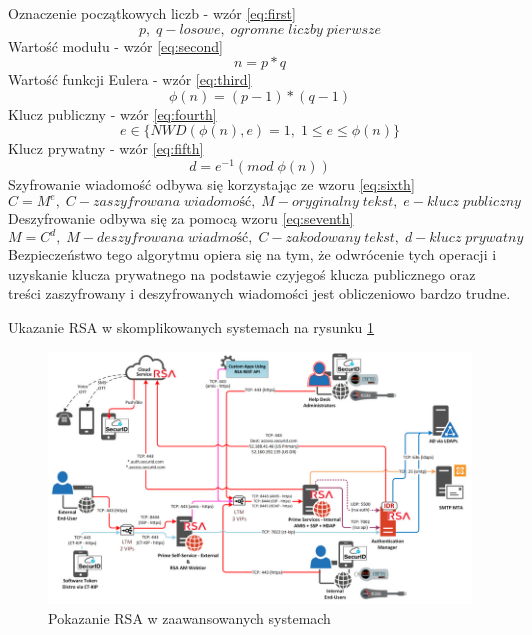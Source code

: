 Oznaczenie początkowych liczb - wzór \ref{eq:first}
\begin{equation}
    p, \; q-losowe, \; ogromne \; liczby \; pierwsze
    \label{eq:first}
\end{equation}
Wartość modułu - wzór \ref{eq:second}
\begin{equation}
    n=p*q
    \label{eq:second}
\end{equation}
Wartość funkcji Eulera - wzór \ref{eq:third}
\begin{equation}
    \phi(n)=(p-1)*(q-1)
    \label{eq:third}
\end{equation}
Klucz publiczny - wzór \ref{eq:fourth}
\begin{equation}
    e \in \{NWD(\phi(n),e)=1, \; 1 \leqslant e \leqslant \phi(n)\}
    \label{eq:fourth}
\end{equation}
Klucz prywatny - wzór \ref{eq:fifth}
\begin{equation}
    d= e^{-1} (mod \; \phi(n))
    \label{eq:fifth}
\end{equation}
Szyfrowanie wiadomość odbywa się korzystając ze wzoru \ref{eq:sixth}
\begin{equation}
    C= M^e, \; C-zaszyfrowana \;  wiadomość, \; M-oryginalny \; tekst, \; e-klucz \; publiczny
    \label{eq:sixth}
\end{equation}
Deszyfrowanie odbywa się za pomocą wzoru \ref{eq:seventh}
\begin{equation}
    M= C^d, \; M-deszyfrowana \; wiadmość, \;C-zakodowany \; tekst, \; d-klucz \; prywatny
    \label{eq:seventh}
\end{equation}
Bezpieczeństwo tego algorytmu opiera się na tym, że odwrócenie tych operacji i uzyskanie klucza prywatnego na podstawie czyjegoś klucza publicznego oraz treści zaszyfrowany i deszyfrowanych wiadomości jest obliczeniowo bardzo trudne.

Ukazanie RSA w skomplikowanych systemach na rysunku \ref{fig:RSASieci}
\begin{figure}[H]
    \centering
    \includegraphics[width=\textwidth]{Images/RSASieci.png}
    \caption{Pokazanie RSA w zaawansowanych systemach}
    \label{fig:RSASieci}
\end{figure}


